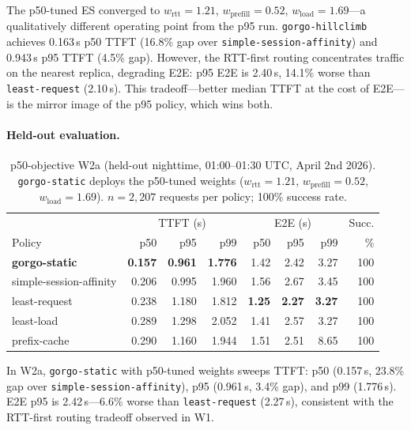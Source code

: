\documentclass{article}
\begin{document}
The p50-tuned ES converged to $w_{\mathrm{rtt}}{=}1.21$,
$w_{\mathrm{prefill}}{=}0.52$, $w_{\mathrm{load}}{=}1.69$---a qualitatively
different operating point from the p95 run. \texttt{gorgo-hillclimb} achieves
0.163\,s p50 TTFT (16.8\% gap over \texttt{simple-session-affinity}) and
0.943\,s p95 TTFT (4.5\% gap). However, the RTT-first routing concentrates
traffic on the nearest replica, degrading E2E: p95 E2E is 2.40\,s, 14.1\%
worse than \texttt{least-request} (2.10\,s). This tradeoff---better median TTFT
at the cost of E2E---is the mirror image of the p95 policy, which wins both.

\paragraph{Held-out evaluation.}

\begin{table}[t]
\centering
\small
\caption{p50-objective W2a (held-out nighttime, 01:00--01:30 UTC, April 2nd 2026).
  \texttt{gorgo-static} deploys the p50-tuned weights ($w_{\mathrm{rtt}}{=}1.21$,
  $w_{\mathrm{prefill}}{=}0.52$, $w_{\mathrm{load}}{=}1.69$).
  $n{=}2{,}207$ requests per policy; 100\% success rate.}
\label{tab:w2_p50}
\begin{tabular}{lrrr|rrr|r}
\toprule
 & \multicolumn{3}{c|}{TTFT (s)} & \multicolumn{3}{c|}{E2E (s)} & Succ. \\
Policy & p50 & p95 & p99 & p50 & p95 & p99 & \% \\
\midrule
\textbf{gorgo-static}    & \textbf{0.157} & \textbf{0.961} & \textbf{1.776} & 1.42 & 2.42          & 3.27          & 100 \\
simple-session-affinity   & 0.206          & 0.995          & 1.960          & 1.56 & 2.67          & 3.45          & 100 \\
least-request             & 0.238          & 1.180          & 1.812          & \textbf{1.25} & \textbf{2.27} & \textbf{3.27} & 100 \\
least-load                & 0.289          & 1.298          & 2.052          & 1.41 & 2.57          & 3.27          & 100 \\
prefix-cache              & 0.290          & 1.160          & 1.944          & 1.51 & 2.51          & 8.65          & 100 \\
\bottomrule
\end{tabular}
\end{table}

In W2a, \texttt{gorgo-static} with p50-tuned weights sweeps TTFT: p50
(0.157\,s, 23.8\% gap over \texttt{simple-session-affinity}), p95 (0.961\,s,
3.4\% gap), and p99 (1.776\,s). E2E p95 is 2.42\,s---6.6\% worse than
\texttt{least-request} (2.27\,s), consistent with the RTT-first routing
tradeoff observed in W1.
\end{document}
